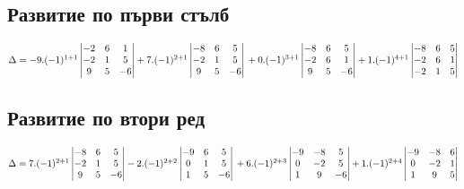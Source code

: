 \documentclass{article}
\begin{document}
    \subsection{Развитие по първи стълб}
    \(\Delta = -9.(-1)^{1 + 1} \begin{vmatrix}
        -2 & 6 & 1\\
        -2 & 1 & 5\\
        9 & 5 & -6
    \end{vmatrix} + 7.(-1)^{2 + 1} \begin{vmatrix}
        -8 & 6 & 5\\
        -2 & 1 & 5\\
        9 & 5 & -6
    \end{vmatrix} \\\\\\
    + 0.(-1)^{3 + 1} \begin{vmatrix}
        -8 & 6 & 5\\
        -2 & 6 & 1\\
        9 & 5 & -6
    \end{vmatrix} + 1.(-1)^{4 + 1} \begin{vmatrix}
        -8 & 6 & 5\\
        -2 & 6 & 1\\
        -2 & 1 & 5\\
    \end{vmatrix}\)
    \subsection{Развитие по втори ред}
    \(\Delta = 7.(-1)^{2 + 1} \begin{vmatrix}
        -8 & 6 & 5\\
        -2 & 1 & 5\\
        9 & 5 & -6
    \end{vmatrix} - 2.(-1)^{2 + 2} \begin{vmatrix}
        -9 & 6 & 5\\
        0 & 1 & 5\\
        1 & 5 & -6
    \end{vmatrix} \\\\\\
    + 6.(-1)^{2 + 3} \begin{vmatrix}
        -9 & -8 & 5\\
        0 & -2 & 5\\
        1 & 9 & -6
    \end{vmatrix} + 1.(-1)^{2 + 4} \begin{vmatrix}
        -9 & -8 & 6\\
        0 & -2 & 1\\
        1 & 9 & 5
    \end{vmatrix}\)
\end{document}

